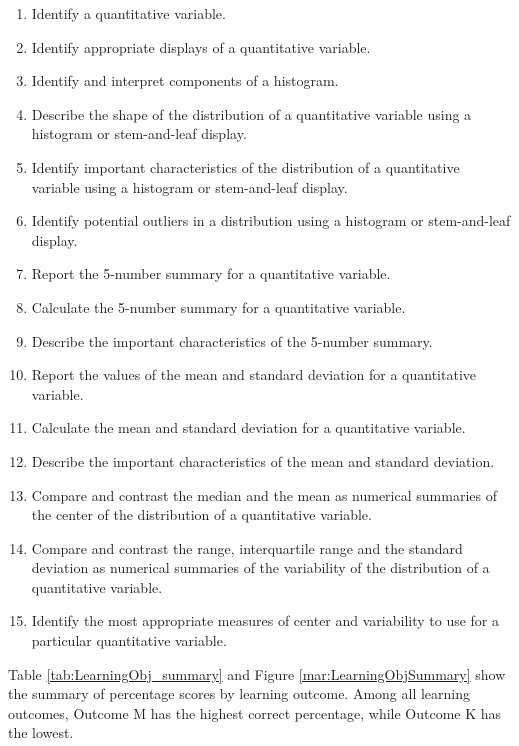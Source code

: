 \documentclass[12pt,english,nohyper]{tufte-handout}\usepackage[]{graphicx}\usepackage[]{color}
\begin{document}
\begin{fullwidth}
\begin{enumerate}[label=\Alph*.,itemsep=-\parsep,leftmargin=*]
  \item
Identify a quantitative variable.
\item Identify appropriate displays of a quantitative variable.
\item Identify and interpret components of a histogram.
\item Describe the shape of the distribution of a quantitative variable using a histogram or stem-and-leaf display.
\item Identify important characteristics of the distribution of a quantitative variable using a histogram or stem-and-leaf display.
\item Identify potential outliers in a distribution using a histogram or stem-and-leaf display.
\item Report the 5-number summary for a quantitative variable.
\item Calculate the 5-number summary for a quantitative variable.
\item Describe the important characteristics of the 5-number summary.
\item Report the values of the mean and standard deviation for a quantitative variable.
\item Calculate the mean and standard deviation for a quantitative variable.
\item Describe the important characteristics of the mean and standard deviation.
\item Compare and contrast the median and the mean as numerical summaries of the center of the distribution of a quantitative variable.
\item Compare and contrast the range, interquartile range and the standard deviation as numerical summaries of the variability of the distribution of a quantitative variable.
\item Identify the most appropriate measures of center and variability to use for a particular quantitative variable.

\end{enumerate}
\end{fullwidth}

\newpage{}

Table \ref{tab:LearningObj_summary} and Figure \ref{mar:LearningObjSummary} show the summary of percentage scores by learning outcome.
Among all learning outcomes, Outcome
M
has the highest correct percentage, while Outcome
K
has the lowest.
\end{document}
